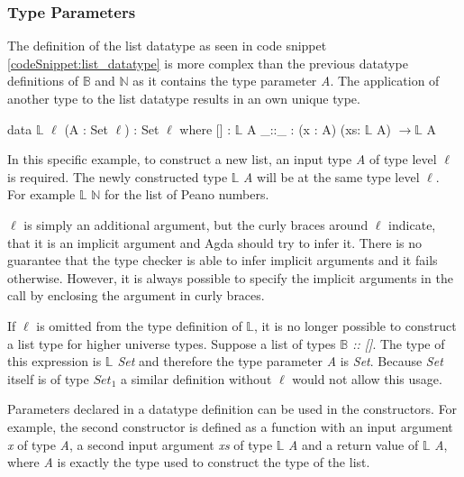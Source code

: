 \subsubsection{Type Parameters}
The definition of the list datatype as seen in code snippet \ref{codeSnippet:list_datatype} is more complex than the previous datatype definitions of $\mathbb{B}$ and $\mathbb{N}$ as it contains the type parameter \emph{A}.
The application of another type to the list datatype results in an own unique type.

\begin{codesnippet}[mathescape=true, caption={Definition of the list datatype in Agda}, label={codeSnippet:list_datatype}]
data $\mathbb{L}$ {$\ell$} (A : Set $\ell$) : Set $\ell$ where
  [] : $\mathbb{L}$ A
  _::_ : (x : A) (xs: $\mathbb{L}$ A) $\rightarrow \mathbb{L}$ A
\end{codesnippet}

In this specific example, to construct a new list, an input type \emph{A} of type level $\ell$  is required.
The newly constructed type $\mathbb{L}$ \emph{A} will be at the same type level $\ell$.
For example $\mathbb{L}$ $\mathbb{N}$ for the list of Peano numbers.

$\ell$ is simply an additional argument, but the curly braces around $\ell$ indicate, that it is an implicit argument and Agda should try to infer it.
There is no guarantee that the type checker is able to infer implicit arguments and it fails otherwise.
However, it is always possible to specify the implicit arguments in the call by enclosing the argument in curly braces\cite{norell:deptyped}.

If $\ell$ is omitted from the type definition of $\mathbb{L}$, it is no longer possible to construct a list type for higher universe types.
Suppose a list of types \emph{$\mathbb{B}$ :: []}. 
The type of this expression is \emph{$\mathbb{L}$ Set} and therefore the type parameter \emph{A} is \emph{Set}. 
Because \emph{Set} itself is of type $Set_1$ a similar definition without $\ell$ would not allow this usage.

Parameters declared in a datatype definition can be used in the constructors.
For example, the second constructor is defined as a function with an input argument \emph{x} of type \emph{A}, a second input argument \emph{xs} of type $\mathbb{L}$ \emph{A} and a return value of $\mathbb{L}$ \emph{A}, where \emph{A} is exactly the type used to construct the type of the list.

